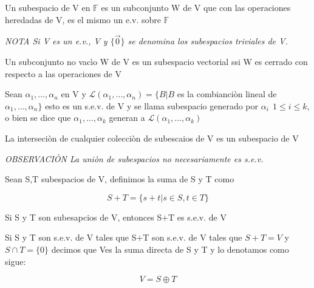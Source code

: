 	\begin{definicion}
	  Un subespacio de V en $\mathbb{F}$  es un subconjunto W de V que con las operaciones heredadas de V, es el mismo un e.v. sobre $\mathbb{F}$ 
\end{definicion}

\emph{NOTA Si V es un e.v., V y $\{ \vec{0} \}$ se denomina los subespacios triviales de V. } 

\begin{proposicion}
	 Un subconjunto no vac\`io W de V es un subespacio vectorial ssi W es cerrado con respecto a las operaciones de V
\end{proposicion}

\begin{definicion}
	Sean $\alpha_1 , \dots , \alpha_n$ en V y $\mathcal{L} (\alpha_1 , \dots , \alpha_n)= \{ B | B $ es la combianci\`on lineal de $\alpha_1 , \dots , \alpha_n \}$ esto es un s.e.v. de V y se llama subespacio generado por $\alpha_i \ \ 1 \leq i \leq k$, o bien se dice que $\alpha_1, \dots , \alpha_k$ generan a $\mathcal{L}(\alpha_1, \dots , \alpha_k)$ 
\end{definicion}
					\begin{proposicion}
						La interseci\`on de cualquier colecci\`on de subescaios de V es un subespacio de V
					\end{proposicion}

			\emph{OBSERVACI\`ON La uni\`on de subespacios no necesariamente es s.e.v.} 


		\begin{definicion}
			Sean S,T subespacios de V, definimos la suma de S y T como 
		\end{definicion}
			\begin{equation}
				S+T = \{ s+t | s \in S , t \in T \} \nonumber
			\end{equation}

		\begin{proposicion}
				Si S y T son subesapcios de V, entonces S$+$T es s.e.v. de V
		\end{proposicion}

			\begin{definicion}
				Si S y T son s.e.v. de  V tales que S$+$T son s.e.v. de V tales que $S+T = V $ y $S \cap T = \{ 0 \}$ decimos que Ves la suma directa de S y  T y lo denotamos como sigue: 
			\end{definicion}
				\begin{equation*}
					V = S \oplus T 
				\end{equation*}

